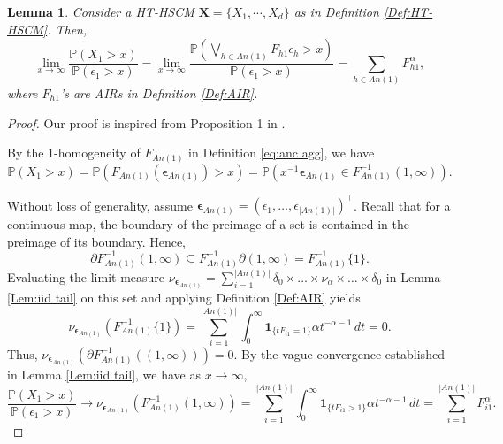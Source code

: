 \documentclass[10pt]{article}
\newtheorem{lemma}[theorem]{Lemma}
\begin{document}
\begin{lemma}\label{Lem:HTHSCM tail}
Consider a HT-HSCM $\boldsymbol{X}=\{X_1,\cdots,X_d\}$ as in Definition \ref{Def:HT-HSCM}.
  Then,
$$
    \lim_{x \to \infty} \frac{\mathbb{P}(X_1 > x)}{\mathbb{P}(\epsilon_1 > x)} =   \lim_{x \to \infty} \frac{\mathbb{P}\left( \bigvee_{h \in An(1)} F_{h1} \epsilon_h > x \right)}{\mathbb{P}(\epsilon_1 > x)} = \sum_{h \in An(1)} F_{h1}^\alpha,
$$
where $F_{h1}$'s are AIRs in Definition \ref{Def:AIR}.
\end{lemma}
\begin{proof}
   Our proof is inspired from Proposition 1 in \cite{fang2025structural}.
    
    By the 1-homogeneity of $F_{{An}(1)}$ in Definition \ref{eq:anc agg},  we have
    \[
        \mathbb{P}(X_1 > x) = \mathbb{P}\left(F_{{An}(1)}(\boldsymbol{\epsilon}_{An(1)}) > x\right) = \mathbb{P}\left(x^{-1}\boldsymbol{\epsilon}_{An(1)} \in F_{{An}(1)}^{-1} (1, \infty)\right).
    \]
    
    Without loss of generality, assume $\boldsymbol{\epsilon}_{An(1)} = (\epsilon_1, \dots, \epsilon_{|An(1)|})^\top$. Recall that for a continuous map, the boundary of the preimage of a set is contained in the preimage of its boundary. Hence,
\[
\partial F_{{An}(1)}^{-1}(1,\infty)
\subseteq
F_{{An}(1)}^{-1}\partial(1,\infty)
=
F_{{An}(1)}^{-1}\{1\}.
\] 
Evaluating the limit measure $ \nu_{\boldsymbol{\epsilon}_{An(1)}}= \sum_{i=1}^{|An(1)|} \delta_0 \times \dots \times \nu_{\alpha} \times \dots \times \delta_0  $ in Lemma \ref{Lem:iid tail} on this set  and applying Definition \ref{Def:AIR}  yields
    \[
    \nu_{\boldsymbol{\epsilon}_{An(1)}} \left( F_{{An}(1)}^{-1}  \{1\}   \right)    = \sum_{i=1}^{|An(1)|} \int_0^\infty \mathbf{1}_{\{tF_{i1}=1\}} \alpha t^{-\alpha-1} \, dt = 0.
    \]
     Thus, $\nu_{\boldsymbol{\epsilon}_{An(1)}}(\partial F_{{An}(1)}^{-1}((1, \infty))) = 0$. By the vague convergence established in Lemma \ref{Lem:iid tail}, we have as $x \to \infty$,
    \[
        \frac{\mathbb{P}(X_1 > x)}{\mathbb{P}(\epsilon_1 > x)} \to \nu_{\boldsymbol{\epsilon}_{An(1)}}\left(F_{{An}(1)}^{-1}(1, \infty)\right) = \sum_{i=1}^{|An(1)|} \int_0^\infty \mathbf{1}_{\{tF_{i1}>1\}} \alpha t^{-\alpha-1} \, dt = \sum_{i=1}^{|An(1)|} F_{i1}^\alpha.
    \]
 

\end{proof}
\end{document}
